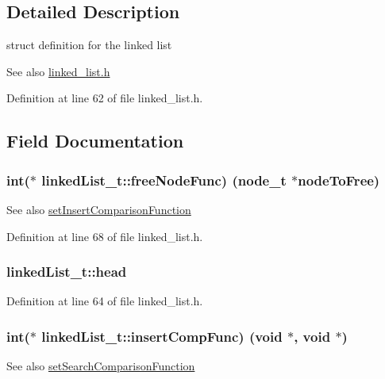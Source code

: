 \subsection{Detailed Description}
struct definition for the linked list 

\begin{DoxySeeAlso}{See also}
\hyperlink{linked__list_8h}{linked\+\_\+list.\+h} 
\end{DoxySeeAlso}


Definition at line 62 of file linked\+\_\+list.\+h.



\subsection{Field Documentation}
\subsubsection[{\texorpdfstring{free\+Node\+Func}{freeNodeFunc}}]{\setlength{\rightskip}{0pt plus 5cm}int($\ast$ linked\+List\+\_\+t\+::free\+Node\+Func) ({\bf node\+\_\+t} $\ast$node\+To\+Free)}\hypertarget{structs__ll_a3cf5521a73fc3474e83aef51c777bb7f}{}\label{structs__ll_a3cf5521a73fc3474e83aef51c777bb7f}
\begin{DoxySeeAlso}{See also}
\hyperlink{linked__list_8c_a45d030386936adffa3eb5586ce93d131}{set\+Insert\+Comparison\+Function} 
\end{DoxySeeAlso}


Definition at line 68 of file linked\+\_\+list.\+h.

\subsubsection[{\texorpdfstring{head}{head}}]{ linked\+List\+\_\+t\+::head}\hypertarget{structs__ll_a0056de8ffd1d9af11ed1a8bb771ae227}{}\label{structs__ll_a0056de8ffd1d9af11ed1a8bb771ae227}


Definition at line 64 of file linked\+\_\+list.\+h.

\subsubsection[{\texorpdfstring{insert\+Comp\+Func}{insertCompFunc}}]{\setlength{\rightskip}{0pt plus 5cm}int($\ast$ linked\+List\+\_\+t\+::insert\+Comp\+Func) (void $\ast$, void $\ast$)}\hypertarget{structs__ll_accf6a1a7fe14f0693107a00a47b86d0d}{}\label{structs__ll_accf6a1a7fe14f0693107a00a47b86d0d}
\begin{DoxySeeAlso}{See also}
\hyperlink{linked__list_8c_a12e5138ac02af0f6b42ff2f1b29c610a}{set\+Search\+Comparison\+Function} 
\end{DoxySeeAlso}



